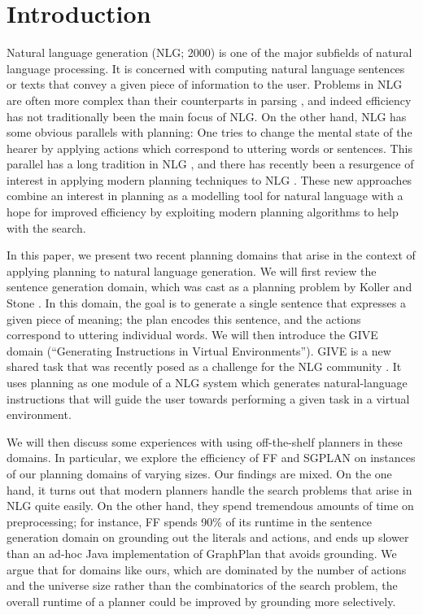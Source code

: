 \section{Introduction} \label{sec:introduction}

Natural language generation (NLG; \citeauthor{reiter00building} 2000)
is one of the major subfields of natural language processing.  It is
concerned with computing natural language sentences or texts that
convey a given piece of information to the user.  Problems in NLG are
often more complex than their counterparts in parsing \cite{KolStr02},
and indeed efficiency has not traditionally been the main focus of
NLG.  On the other hand, NLG has some obvious parallels with planning:
One tries to change the mental state of the hearer by applying actions
which correspond to uttering words or sentences.  This parallel has a
long tradition in NLG \cite{appelt:planning,young94dpocl}, and there
has recently been a resurgence of interest in applying modern planning
techniques to NLG \cite{Steedman-Petrick:07,KolSto07,benotti08b}.
These new approaches combine an interest in planning as a modelling
tool for natural language with a hope for improved efficiency by
exploiting modern planning algorithms to help with the search.

In this paper, we present two recent planning domains that arise in
the context of applying planning to natural language generation.  We
will first review the sentence generation domain, which was cast as a
planning problem by Koller and Stone \citeyear{KolSto07}.  In this
domain, the goal is to generate a single sentence that expresses a
given piece of meaning; the plan encodes this sentence, and the
actions correspond to uttering individual words.  We will then
introduce the GIVE domain (``Generating Instructions in Virtual
Environments'').  GIVE is a new shared task that was recently posed as
a challenge for the NLG community
\cite{alexander07:_shared_task_propos}.  It uses planning as one
module of a NLG system which generates natural-language instructions
that will guide the user towards performing a given task in a virtual
environment.

We will then discuss some experiences with using off-the-shelf
planners in these domains.  In particular, we explore the efficiency
of FF \cite{HoffmannNebel01} and SGPLAN
\cite{hsu06:_new_featur_in_sgplan_for} on instances of our planning
domains of varying sizes.  Our findings are mixed.  On the one hand,
it turns out that modern planners handle the search problems that
arise in NLG quite easily.  On the other hand, they spend tremendous
amounts of time on preprocessing; for instance, FF spends 90\% of its
runtime in the sentence generation domain on grounding out the
literals and actions, and ends up slower than an ad-hoc Java
implementation of GraphPlan that avoids grounding.  We argue that for
domains like ours, which are dominated by the number of actions and the
universe size rather than the combinatorics of the search problem, the
overall runtime of a planner could be improved by grounding more
selectively.








